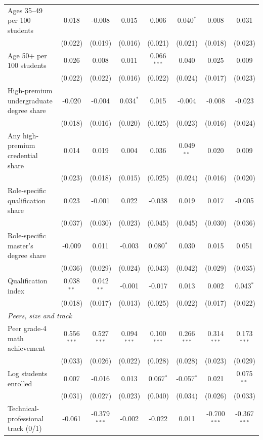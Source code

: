 \begin{table}[!htbp]
{\begin{tabular}{lccccccc}
\quad Ages 35--49 per 100 students & 0.018 & -0.008 & 0.015 & 0.006 & 0.040$^{*}$ & 0.008 & 0.031 \\
 & (0.022) & (0.019) & (0.016) & (0.021) & (0.021) & (0.018) & (0.023) \\
\quad Age 50+ per 100 students & 0.026 & 0.008 & 0.011 & 0.066$^{***}$ & 0.040 & 0.025 & 0.009 \\
 & (0.022) & (0.022) & (0.016) & (0.022) & (0.024) & (0.017) & (0.023) \\
\quad High-premium undergraduate degree share & -0.020 & -0.004 & 0.034$^{*}$ & 0.015 & -0.004 & -0.008 & -0.023 \\
 & (0.018) & (0.016) & (0.020) & (0.025) & (0.023) & (0.016) & (0.024) \\
\quad Any high-premium credential share & 0.014 & 0.019 & 0.004 & 0.036 & 0.049$^{**}$ & 0.020 & 0.009 \\
 & (0.023) & (0.018) & (0.015) & (0.025) & (0.024) & (0.016) & (0.020) \\
\quad Role-specific qualification share & 0.023 & -0.001 & 0.022 & -0.038 & 0.019 & 0.017 & -0.005 \\
 & (0.037) & (0.030) & (0.023) & (0.045) & (0.045) & (0.030) & (0.036) \\
\quad Role-specific master's degree share & -0.009 & 0.011 & -0.003 & 0.080$^{*}$ & 0.030 & 0.015 & 0.051 \\
 & (0.036) & (0.029) & (0.024) & (0.043) & (0.042) & (0.029) & (0.035) \\
\quad Qualification index & 0.038$^{**}$ & 0.042$^{**}$ & -0.001 & -0.017 & 0.013 & 0.002 & 0.043$^{*}$ \\
 & (0.018) & (0.017) & (0.013) & (0.025) & (0.022) & (0.017) & (0.022) \\
\multicolumn{8}{l}{\textit{Peers, size and track}} \\
\quad Peer grade-4 math achievement & 0.556$^{***}$ & 0.527$^{***}$ & 0.094$^{***}$ & 0.100$^{***}$ & 0.266$^{***}$ & 0.314$^{***}$ & 0.173$^{***}$ \\
 & (0.033) & (0.026) & (0.022) & (0.028) & (0.028) & (0.023) & (0.029) \\
\quad Log students enrolled & 0.007 & -0.016 & 0.013 & 0.067$^{*}$ & -0.057$^{*}$ & 0.021 & 0.075$^{**}$ \\
 & (0.031) & (0.027) & (0.023) & (0.040) & (0.034) & (0.026) & (0.033) \\
\quad Technical-professional track (0/1) & -0.061 & -0.379$^{***}$ & -0.002 & -0.022 & 0.011 & -0.700$^{***}$ & -0.367$^{***}$ \\

\end{tabular}}
\end{table}
